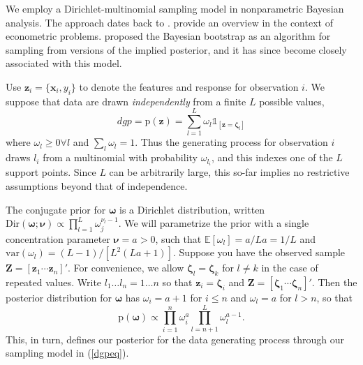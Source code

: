 \documentclass{article}
\begin{document}
We employ a Dirichlet-multinomial sampling model in nonparametric
Bayesian analysis. The approach dates back to
\citet{ferguson_bayesian_1973}. \citet{chamberlain_nonparametric_2003}
provide an overview in the context of econometric problems.
\citet{rubin_bayesian_1981} proposed the Bayesian bootstrap as an
algorithm for sampling from versions of the implied posterior, and it has since become closely associated with
this model.

Use $\mathbf{z}_i = \{\mathbf{x}_i,y_i\}$ to denote the  features
and response  for observation $i$. We suppose that data are drawn
\emph{independently} from a finite  $L$  possible values,
\begin{equation}\label{dgpeq}
dgp = \mathrm{p}(\mathbf{z}) = \sum_{l=1}^L \omega_l \mathds{1}_{[\mathbf{z} = \boldsymbol{\zeta}_l]}
\end{equation}
where $\omega_l\geq0\forall l$ and $\sum_l \omega_l = 1$. Thus the generating
process for observation $i$ draws $l_i$ from a multinomial with probability
$\omega_{l_i}$, and this indexes one of the $L$ support points. Since $L$ can
be arbitrarily large, this so-far implies no restrictive assumptions beyond
that of independence.

The conjugate prior for $\boldsymbol{\omega}$ is a Dirichlet
distribution, written
$\mathrm{Dir}(\boldsymbol{\omega}; \boldsymbol{\nu}) \propto \prod_{l=1}^L\omega_j^{\nu_l-1}$.
We will parametrize the prior with a single concentration parameter
$\boldsymbol{\nu} = a >0$, such that $\mathbb{E}[\omega_l] = a/La = 1/L$
and $\mathrm{var}(\omega_l) = (L-1)/[L^2(La+1)]$. Suppose you have the
observed sample $\mathbf{Z} = [\mathbf{z}_1 \cdots \mathbf{z}_n]'$. For
convenience, we allow $\boldsymbol{\zeta}_l=\boldsymbol{\zeta}_k$ for
$l \neq k$ in the case of repeated values. Write
$l_1 \dots l_n = 1 \dots n$ so that
$\mathbf{z}_i = \boldsymbol{\zeta}_i$ and
$\mathbf{Z} = [\boldsymbol{\zeta}_1 \cdots \boldsymbol{\zeta}_n]'$. Then
the posterior distribution for $\boldsymbol{\omega}$ has
$\omega_i = a+1$ for $i\leq n$ and $\omega_l = a$ for $l>n$, so that
\begin{equation}\label{omegapost}
\mathrm{p}(\boldsymbol{\omega}) \propto \prod_{i=1}^n \omega_i^{a} \prod_{l=n+1}^L \omega_l^{a-1}.
\end{equation}
This, in turn, defines our posterior for the data generating process
through our sampling model in (\ref{dgpeq}).
\end{document}
